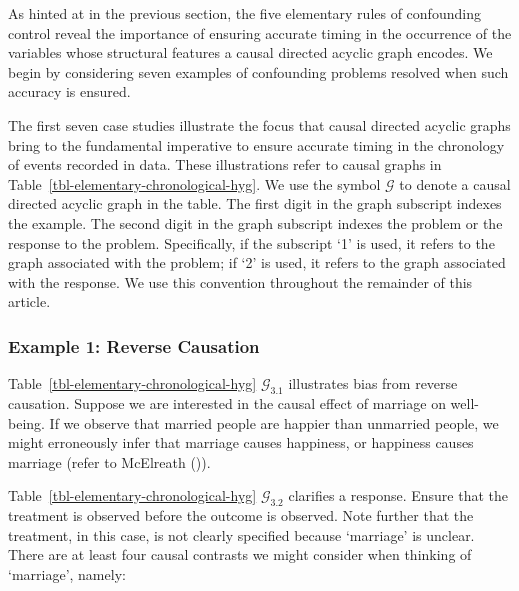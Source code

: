 \documentclass[
  single column]{article}
\begin{document}
\begin{table}

\caption{\label{tbl-elementary-chronological-hyg}}

\centering{

\captionsetup{labelsep=none}

\terminologychronologicalhygeine

}

\end{table}%

As hinted at in the previous section, the five elementary rules of
confounding control reveal the importance of ensuring accurate timing in
the occurrence of the variables whose structural features a causal
directed acyclic graph encodes. We begin by considering seven examples
of confounding problems resolved when such accuracy is ensured.

The first seven case studies illustrate the focus that causal directed
acyclic graphs bring to the fundamental imperative to ensure accurate
timing in the chronology of events recorded in data. These illustrations
refer to causal graphs in Table~\ref{tbl-elementary-chronological-hyg}.
We use the symbol \(\mathcal{G}\) to denote a causal directed acyclic
graph in the table. The first digit in the graph subscript indexes the
example. The second digit in the graph subscript indexes the problem or
the response to the problem. Specifically, if the subscript `1' is used,
it refers to the graph associated with the problem; if `2' is used, it
refers to the graph associated with the response. We use this convention
throughout the remainder of this article.

\subsubsection{Example 1: Reverse
Causation}\label{example-1-reverse-causation}

Table~\ref{tbl-elementary-chronological-hyg} \(\mathcal{G}_{3.1}\)
illustrates bias from reverse causation. Suppose we are interested in
the causal effect of marriage on well-being. If we observe that married
people are happier than unmarried people, we might erroneously infer
that marriage causes happiness, or happiness causes marriage (refer to
McElreath ()).

Table~\ref{tbl-elementary-chronological-hyg} \(\mathcal{G}_{3.2}\)
clarifies a response. Ensure that the treatment is observed before the
outcome is observed. Note further that the treatment, in this case, is
not clearly specified because `marriage' is unclear. There are at least
four causal contrasts we might consider when thinking of `marriage',
namely:
\end{document}
